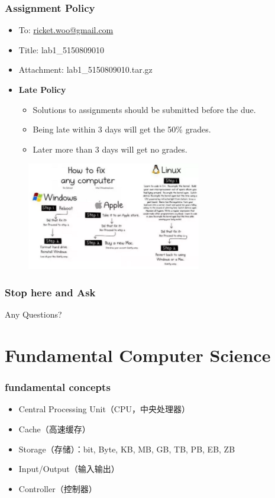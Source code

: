 \documentclass[red]{beamer}
\begin{document}
\begin{CJK*}{UTF8}{gbsn}
\begin{frame}
\frametitle{Assignment Policy}
\begin{itemize}
    \item To: \url{ricket.woo@gmail.com}
    \item Title: lab1\_5150809010
    \item Attachment: lab1\_5150809010.tar.gz
    \item \textbf{Late Policy}
    \begin{itemize}
        \item Solutions to assignments should be submitted before the due.
        \item Being late within 3 days will get the 50\% grades.
        \item Later more than 3 days will get no grades.
    \end{itemize}
\end{itemize}
\end{frame}

\begin{frame}
\begin{figure}[h]
\includegraphics[width=3in]{images/fix_computers.png}
\end{figure}
\end{frame}


\begin{frame}
\frametitle{Stop here and Ask}
\begin{center}
\Huge Any Questions?
\end{center}
\end{frame}

\section[CS-Fundamentals]{Fundamental Computer Science}

\begin{frame}
\frametitle{fundamental concepts}
\begin{itemize}
	\item Central Processing Unit（CPU，中央处理器）
	\item Cache（高速缓存）
	\item Storage（存储）：bit, Byte, KB, MB, GB, TB, PB, EB, ZB
	\item Input/Output（输入输出）
	\item Controller（控制器）
\end{itemize}
\end{frame}


\end{CJK*}
\end{document}
